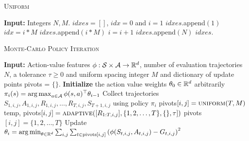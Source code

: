     \begin{algorithm}[t]
        \caption{\textsc{Uniform}}\label{alg:uniform}
        \begin{algorithmic}
        \State \textbf{Input:} Integers $N,M$.
        \State $idxes = []$, $idx = 0$ and $i=1$
        \State $idxes$.append$(1)$
        \State $idx = i * M$
        \State $idxes.$append$(i * M)$
        \State $i = i + 1$
        \EndWhile
        \State $idxes$.append$(N)$
        \State \Return $idxes$.
        \end{algorithmic}
        \end{algorithm}



        \begin{algorithm}[t]
            \caption{\textsc{Monte-Carlo Policy Iteration}}\label{alg:mc}
            \begin{algorithmic}
            \State \textbf{Input:} Action-value features $\phi: \mathcal{S} \times \mathcal{A} \rightarrow \mathbb{R}^d$, number of evaluation trajectories $N$, a tolerance $\tau \geq 0$ and uniform spacing integer $M$ and dictionary of update points pivots = $\{\}$.
            \State \textbf{Initialize} the action value weights $\theta_0 \in \mathbb{R}^d$ arbitrarily
                \State $\pi_i(s) = \mathop{\rm arg\,max}_{a \in \mathcal{A}} \phi(s,a)^\top \theta_{i-1}$
                    \State Collect trajectories $S_{1,i,j},A_{1,i,j},R_{1,i,j},\dotsc,R_{T,i,j},S_{T+1,i,j}$ using policy $\pi_i$
                    \State pivots$[i,j] = \textsc{uniform}(T, M)$
                    \State temp, pivots$[i,j] = \textsc{adaptive}([R_{1:T,i,j}], \{1,2,\dotsc,T\},\{\}, \tau])$
                    \Else
                    \State pivots$[i,j]=\{1,2,\dotsc,T\}$
                    \EndIf
                \EndFor
                \State Update $\theta_i = \mathop{\rm arg\,min}_{\theta \in \mathbb{R}^d} \sum_{i,j}\sum_{t\in\text{pivots}[i,j]} \left(\phi(S_{t,i,j},A_{t,i,j}) - G_{t,i,j}\right)^2$
            \EndFor
            \end{algorithmic}
            \end{algorithm}

